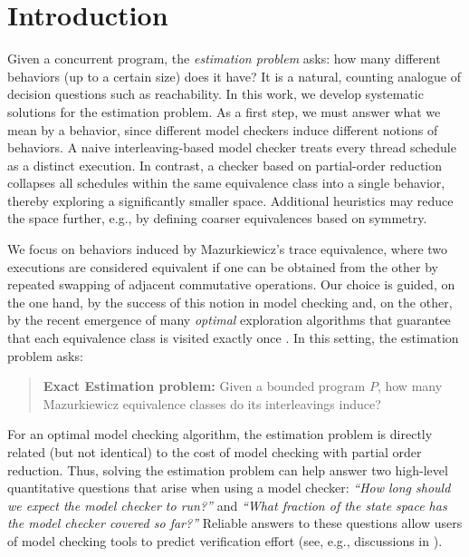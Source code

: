 
\section{Introduction}

Given a concurrent program, the \emph{estimation problem} asks: how many different behaviors (up to a certain size) does it have?
It is a natural, counting analogue of decision questions such as reachability.
%
In this work, we develop systematic solutions for the estimation problem.
As a first step, we must answer what we mean by a behavior, since 
different model checkers induce different notions of behaviors.
A naive interleaving-based model checker treats every thread schedule as a distinct execution.
In contrast, a checker based on partial-order reduction \cite{GodefroidThesis, spin, dpor, verisoft,pop-dpor,optimal-dpor,nidhugg,trust} 
collapses all schedules within the same equivalence class into a single behavior, 
thereby exploring a significantly smaller space.
Additional heuristics may reduce the space further, e.g., by defining coarser equivalences based on symmetry.

We focus on behaviors induced by Mazurkiewicz's trace equivalence, where two executions are considered equivalent
if one can be obtained from the other by repeated swapping of adjacent commutative operations.
Our choice is guided, on the one hand, by the success of this notion in model checking
\cite{spin, verisoft, dpor,optimal-dpor, trust}
and, on the other, by the recent emergence of many \emph{optimal} exploration algorithms that guarantee that each equivalence class is visited exactly 
once \cite{optimal-dpor, trust, must}.
In this setting, the estimation problem asks:
\begin{quote}
{\bf Exact Estimation problem:} Given a bounded program \(P\), how many Mazurkiewicz equivalence classes do its interleavings induce?
\end{quote}

For an optimal model checking algorithm, the estimation problem is directly related (but not identical) to the cost of model checking with partial order reduction.
Thus, solving the estimation problem can help answer two
high-level quantitative questions that arise when using a model checker:
\emph{``How long should we expect the model checker to run?''} and
\emph{``What fraction of the state space has the model checker covered so far?''}
Reliable answers to these questions allow users of model checking tools to predict verification effort (see, e.g., discussions in \cite{WangCGMK18,gator}).
%

